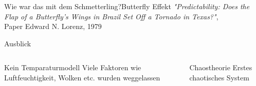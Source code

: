 \documentclass[presentation.tex]{subfiles}
\begin{document}
	\begin{frame}{Wie war das mit dem Schmetterling?}{Butterfly Effekt}
		\textit{"Predictability: Does the Flap of a Butterfly's Wings in Brazil Set Off a Tornado in Texas?"}, \\
		Paper Edward N. Lorenz, 1979
	\end{frame}
	\begin{frame}{Ausblick}
		\begin{columns}[T]
			\begin{column}{.5\textwidth}
				\begin{block}{Kein Temparaturmodell}
					Viele Faktoren wie Luftfeuchtigkeit, Wolken etc. wurden weggelassen 
				\end{block}
			\end{column}
			\begin{column}{.5\textwidth}
				\begin{block}{Chaostheorie}
					Erstes chaotisches System
				\end{block}
			\end{column}
		\end{columns}
	\end{frame}
\end{document}
